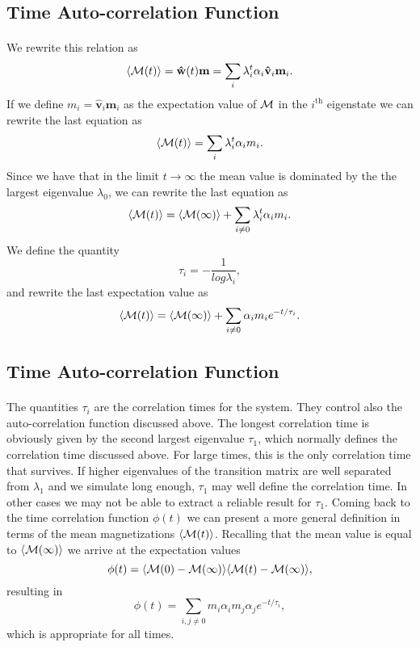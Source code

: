 \documentclass[%
twoside,                 %
final,                   %
10pt]{article}
\begin{document}
\subsection*{Time Auto-correlation Function}

\paragraph{}
We rewrite this relation  as
 \[
 \langle {\cal M}(t) \rangle  = \mathbf{\hat{w}}(t)\mathbf{m}=\sum_i\lambda_i^t\alpha_i\mathbf{\hat{v}}_i\mathbf{m}_i.
\] 
If we define $m_i=\mathbf{\hat{v}}_i\mathbf{m}_i$ as the expectation value of
${\cal M}$ in the $i^{\mathrm{th}}$ eigenstate we can rewrite the last equation as
 \[
 \langle {\cal M}(t) \rangle  = \sum_i\lambda_i^t\alpha_im_i.
\] 
Since we have that in the limit $t\rightarrow \infty$ the mean value is dominated by the 
the largest eigenvalue $\lambda_0$, we can rewrite the last equation as
 \[
 \langle {\cal M}(t) \rangle  = \langle {\cal M}(\infty) \rangle+\sum_{i\ne 0}\lambda_i^t\alpha_im_i.
\] 
We define the quantity
\[
   \tau_i=-\frac{1}{log\lambda_i},
\]
and rewrite the last expectation value as
 \[
 \langle {\cal M}(t) \rangle  = \langle {\cal M}(\infty) \rangle+\sum_{i\ne 0}\alpha_im_ie^{-t/\tau_i}.
\label{eq:finalmeanm}
\]




\subsection*{Time Auto-correlation Function}

\paragraph{}

The quantities $\tau_i$ are the correlation times for the system. They control also the auto-correlation function 
discussed above.  The longest correlation time is obviously given by the second largest
eigenvalue $\tau_1$, which normally defines the correlation time discussed above. For large times, this is the 
only correlation time that survives. If higher eigenvalues of the transition matrix are well separated from 
$\lambda_1$ and we simulate long enough,  $\tau_1$ may well define the correlation time. 
In other cases we may not be able to extract a reliable result for $\tau_1$. 
Coming back to the time correlation function $\phi(t)$ we can present a more general definition in terms
of the mean magnetizations $ \langle {\cal M}(t) \rangle$. Recalling that the mean value is equal 
to $ \langle {\cal M}(\infty) \rangle$ we arrive at the expectation values
\[
\phi(t) =\langle {\cal M}(0)-{\cal M}(\infty)\rangle \langle {\cal M}(t)-{\cal M}(\infty)\rangle,
\]
resulting in
\[
\phi(t) =\sum_{i,j\ne 0}m_i\alpha_im_j\alpha_je^{-t/\tau_i},
\]
which is appropriate for all times.
\end{document}
